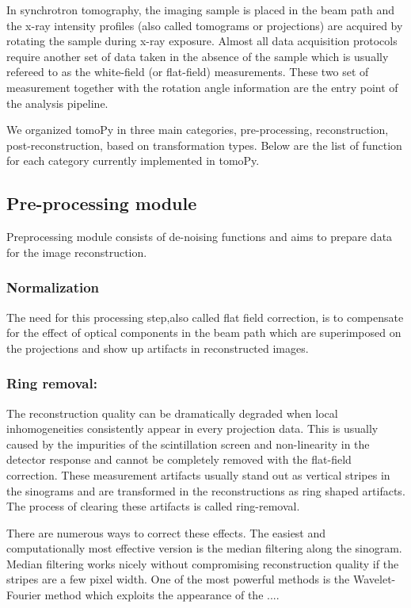 \documentclass[pdf]{iucr}              %
\begin{document}
In synchrotron tomography, the imaging sample is placed in the beam path and the x-ray intensity profiles (also called tomograms or projections) are acquired by rotating the sample during x-ray exposure. Almost all data acquisition protocols require another set of data taken in the absence of the sample which is usually refereed to as the white-field (or flat-field) measurements. These two set of measurement together with the rotation angle information are the entry point of the analysis pipeline.

We organized tomoPy in three main categories, pre-processing, reconstruction, post-reconstruction, based on transformation types. Below are the list of function for each category currently implemented in tomoPy.

\subsection{Pre-processing module}

Preprocessing module consists of de-noising functions and aims to prepare data for the image reconstruction.

\subsubsection{Normalization}

The need for this processing step,also called flat field correction, is to compensate for the effect of optical components in the beam path which are superimposed on the projections and show up artifacts in reconstructed images. 

\subsubsection{Ring removal:}

The reconstruction quality can be dramatically degraded when local inhomogeneities consistently appear in every projection data.  This is usually caused by the impurities of the scintillation screen and non-linearity in the detector response and cannot be completely removed with the flat-field correction. These measurement artifacts usually stand out as vertical stripes in the sinograms and are transformed in the reconstructions as ring shaped artifacts. The process of clearing these artifacts is called ring-removal. 

There are numerous ways to correct these effects. The easiest and computationally most effective version is the median filtering along the sinogram. Median filtering works nicely without compromising reconstruction quality if the stripes are a few pixel width. One of the most powerful methods is the Wavelet-Fourier method \cite{Munch:09} which exploits the appearance of the ....
\end{document}
